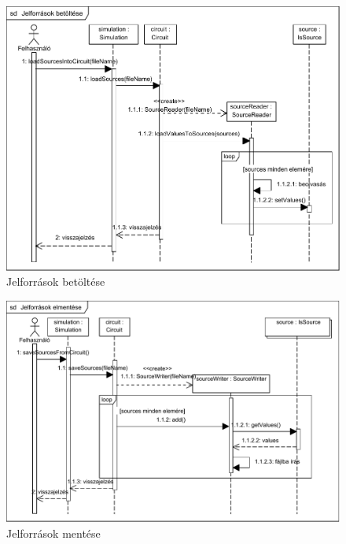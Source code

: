 \begin{figure}[H]
\begin{center}
\includegraphics{chapters/chapter04/seqdiagrams/jelforrasok_betoltese.pdf}
\caption{Jelforrások betöltése}
\label{fig:jelforrasok_betoltese}
\end{center}
\end{figure}

\begin{figure}[H]
\begin{center}
\includegraphics{chapters/chapter04/seqdiagrams/jelforrasok_mentese.pdf}
\caption{Jelforrások mentése}
\label{fig:jelforrasok_mentese}
\end{center}
\end{figure}

